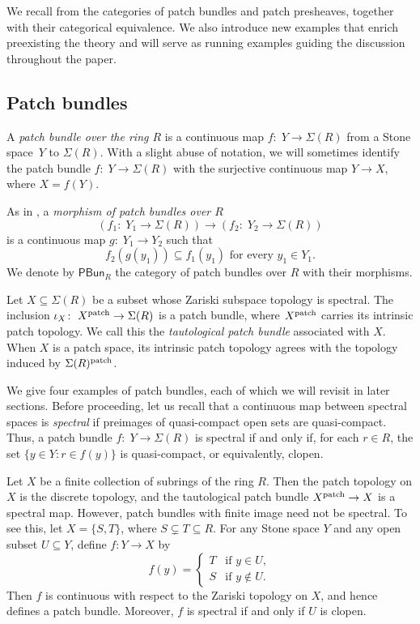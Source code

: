 \documentclass[11pt]{amsart}
\begin{document}
 We recall from \cite{CosOlb} the categories of patch bundles and patch presheaves, together with their categorical equivalence. We also introduce new examples that enrich preexisting the theory and will serve as running examples guiding the discussion throughout the paper. 


\subsection[Patch bundles]{Patch bundles}\label{subsec: patch bundles} A {\it patch bundle over the ring $R$} is a continuous map $f\colon\;  Y \rightarrow \Sigma(R)$ from a Stone space~$Y$ to $\Sigma(R)$.
With a slight abuse of notation, we will sometimes identify the patch bundle $f\colon\; Y \rightarrow \Sigma(R)$ with the surjective continuous map $Y\to X$, where $X=f(Y)$. 

 As in \cite[Definition 3.11]{CosOlb}, a {\it morphism of patch bundles over $R$}
\[(f_1\colon\; Y_1\to {\Sigma(R)})\to (f_2\colon\; Y_2\to {\Sigma(R)})\]
is a continuous map $g\colon\; Y_1\to Y_2$ such that
\[f_2(g(y_1))\subseteq f_1(y_1)\text{ for every }y_1\in {Y_1}.\] We denote by  $\mathsf{PBun}_R$ the category of patch bundles over $R$ with their morphisms.

Let $X\subseteq\Sigma(R)$ be a subset whose Zariski subspace topology is spectral. The inclusion $\iota_X\colon\; X^{\rm patch}\to\Sigma(R)$ is a patch bundle, where $X^{\rm patch}$ carries its intrinsic patch topology. We call this the {\it tautological patch bundle} associated with $X$. When $X$ is a patch space, its intrinsic patch topology agrees with the topology induced by $\Sigma(R)^{\rm patch}$.


\medskip

We give four examples of patch bundles, each of which we will revisit in later sections. 
Before proceeding, let us recall that a continuous map between spectral spaces is {\it spectral} if preimages of quasi-compact open sets are quasi-compact. Thus, a patch bundle $f\colon\; Y\to \Sigma(R)$ is spectral if and only if, for each $r\in R$, the set $\{y\in Y : r\in f(y)\}$ is quasi-compact, or equivalently, clopen.


\begin{example} \label{finite 1} Let $X$ be a finite collection of subrings of the ring $R$. Then the patch topology on $X$ is the discrete topology, 
and the tautological patch bundle $X^{\rm patch} \rightarrow X$ is a spectral map. However, patch bundles with finite image need not be spectral. To see this, let $X=\{S,T\}$,
where $S\subsetneq T\subseteq R$. For any Stone space
$Y$ and any open subset $U\subseteq Y$, define
$f:Y\to X$ by
\[
f(y)=
\begin{cases}
T & \text{if } y\in U,\\
S & \text{if } y\notin U.
\end{cases}
\] Then $f$ is continuous with respect to the Zariski topology on $X$, and hence defines a patch bundle.
Moreover, $f$ is spectral if and only if $U$ is clopen.
\end{example}
\end{document}
